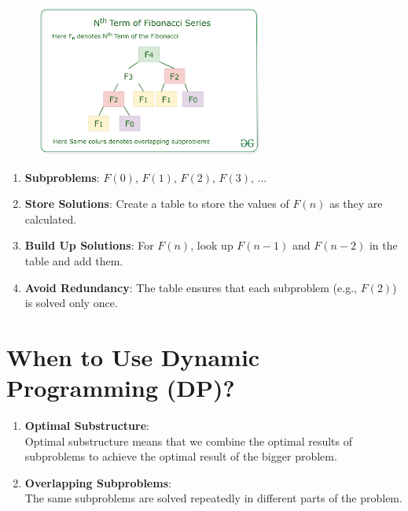 \begin{table}[H]
    \begin{minipage}{0.45\linewidth}
        \begin{figure}[H]
            \includegraphics[height=5cm]{Pictures/ds-algo/nthfibonacciseriesdynamicprogramming.png}
        \end{figure}
    \end{minipage}
    \hfill
    \begin{minipage}{0.52\linewidth}
        \begin{enumerate}
            \item \textbf{Subproblems}: $F(0)$, $F(1)$, $F(2)$, $F(3)$, ...
            \item \textbf{Store Solutions}: Create a table to store the values of $F(n)$ as they are calculated.
            \item \textbf{Build Up Solutions}: For $F(n)$, look up $F(n-1)$ and $F(n-2)$ in the table and add them.
            \item \textbf{Avoid Redundancy}: The table ensures that each subproblem (e.g., $F(2)$) is solved only once.
        \end{enumerate}        
    \end{minipage}
\end{table}



\section{When to Use Dynamic Programming (DP)?}

\begin{enumerate}
    \item \textbf{Optimal Substructure}:\\
    Optimal substructure means that we combine the optimal results of subproblems to achieve the optimal result of the bigger problem.
    \item \textbf{Overlapping Subproblems}:\\
    The same subproblems are solved repeatedly in different parts of the problem.
\end{enumerate}

